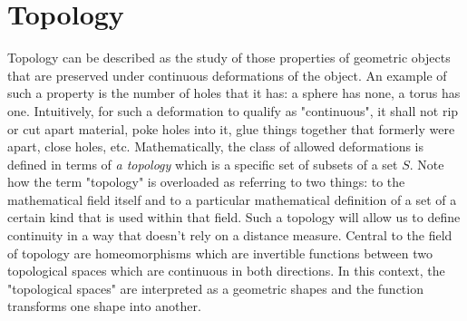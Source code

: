 \chapter{Topology}
Topology can be described as the study of those properties of geometric objects that are preserved under continuous deformations of the object. An example of such a property is the number of holes that it has: a sphere has none, a torus has one. Intuitively, for such a deformation to qualify as "continuous", it shall not rip or cut apart material, poke holes into it, glue things together that formerly were apart, close holes, etc. Mathematically, the class of allowed deformations is defined in terms of \emph{a topology} which is a specific set of subsets of a set $S$. Note how the term "topology" is overloaded as referring to two things: to the mathematical field itself and to a particular mathematical definition of a set of a certain kind that is used within that field. Such a topology will allow us to define continuity in a way that doesn't rely on a distance measure. Central to the field of topology are homeomorphisms which are invertible functions between two topological spaces which are continuous in both directions. In this context, the "topological spaces" are interpreted as a geometric shapes and the function transforms one shape into another.





\begin{comment}


https://en.wikipedia.org/wiki/Topology
https://en.wikipedia.org/wiki/Topological_space

https://en.wikipedia.org/wiki/Topological_property

https://en.wikipedia.org/wiki/Homeomorphism
https://en.wikipedia.org/wiki/Homotopy

\end{comment}
